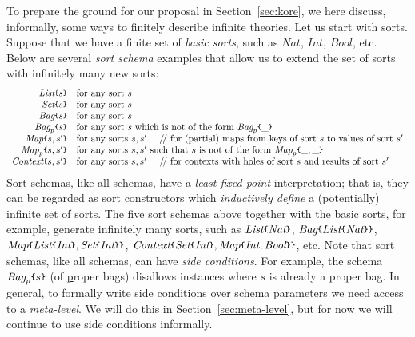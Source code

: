 \documentclass[UTF8,11pt]{article}
\theoremstyle{plain}
\theoremstyle{definition}
\theoremstyle{remark}
\newcommand{\Nat}{\textit{Nat}}
\newcommand{\Int}{\textit{Int}}
\newcommand{\Bool}{\textit{Bool}}
\newcommand{\List}{\textit{List}}
\newcommand{\Bag}{\textit{Bag}}
\newcommand{\Set}{\textit{Set}}
\newcommand{\Map}{\textit{Map}}
\newcommand{\Context}{\textit{Context}}
\newcommand{\parametric}[2]{{#1}\raisebox{.2ex}{\texttt{\footnotesize{\{}}}#2\raisebox{.2ex}{\texttt{\footnotesize{\}}}}}
\newcommand{\doubleslash}{/\!/{ }}
\begin{document}
To prepare the ground for our proposal in Section~\ref{sec:kore},
we here discuss, informally, some ways to finitely describe infinite theories.
Let us start with sorts.
Suppose that we have a finite set of \emph{basic sorts}, such as
$\Nat$, $\Int$, $\Bool$, etc.
Below are several \emph{sort schema} examples that allow us to extend the set
of sorts with infinitely many new sorts:
$$
\begin{array}{rl}
\parametric{\List}{s} &
\textrm{for any sort $s$} \\
\parametric{\Set}{s} &
\textrm{for any sort $s$} \\
\parametric{\Bag}{s} &
\textrm{for any sort $s$} \\
\parametric{\Bag_p}{s} &
\textrm{for any sort $s$ which is not of the form $\parametric{\Bag_p}{\_}$} \\
\parametric{\Map}{s,s'} &
\textrm{for any sorts $s,s'$ \ \ \ \doubleslash for (partial) maps from keys of 
sort 
$s$ to values of sort $s'$} \\
\parametric{\Map_p}{s,s'} &
\textrm{for any sorts $s,s'$ such that $s$ is not of the form $\parametric{\Map_p}{\_,\_}$}
\\
\parametric{\Context}{s,s'} &
\textrm{for any sorts $s,s'$ \ \ \ \doubleslash for contexts with holes of sort 
$s$ and results of sort $s'$}
\end{array}
$$
Sort schemas, like all schemas, have a \emph{least fixed-point}
interpretation;
that is, they can be regarded as sort constructors which
{\em inductively define} a (potentially) infinite set of sorts.
The five sort schemas above together with the basic sorts, for example,
generate infinitely many sorts, such as
$\parametric{\List}{\Nat}$,
$\parametric{\Bag}{\parametric{\List}{\Nat}}$,
$\parametric{\Map}{\parametric{\List}{\Int},\parametric{\Set}{\Int}}$,
$\parametric{\Context}{\parametric{\Set}{\Int},\parametric{\Map}{\Int,\Bool}}$,
etc.
Note that sort schemas, like all schemas, can have \emph{side conditions}.
For example, the schema $\parametric{\Bag_p}{s}$ (of \underline{p}roper bags)
disallows instances where $s$ is already a proper bag.
In general, to formally write side conditions over schema parameters we need
access to a \emph{meta-level}.
We will do this in Section~\ref{sec:meta-level}, but for now we will continue
to use side conditions informally.
\end{document}

